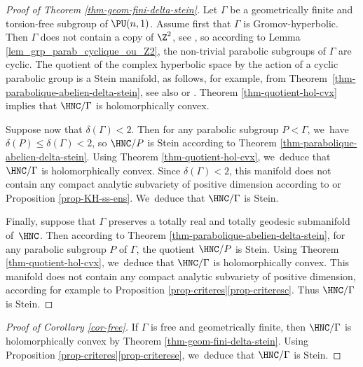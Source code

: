 \begin{proof}[Proof of Theorem \ref{thm-geom-fini-delta-stein}]
Let $\Gamma$ be a geometrically finite and torsion-free subgroup of $\PU(n,1)$. Assume first that $\Gamma$ is Gromov-hyperbolic. Then $\Gamma$ does not contain a copy of $\Z^{2}$, see \cite[Cor.\,III.$\Gamma$.3.10]{bridsonMetricSpacesNonpositive1999}, so according to Lemma \ref{lem_grp_parab_cyclique_ou_Z2}, the non-trivial parabolic subgroups of $\Gamma$ are cyclic. The quotient of the complex hyperbolic space by the action of a cyclic parabolic group is a Stein manifold, as follows, for example, from Theorem~\ref{thm-parabolique-abelien-delta-stein}, see also \cite{defabritiisQuotientsUnitBall2001manuel} or \cite{miebachQuotientsBoundedHomogeneous2010}. Theorem \ref{thm-quotient-hol-cvx} implies that $\HNC/\Gamma$ is holomorphically convex.

Suppose now that $\delta(\Gamma)<2$. Then for any parabolic subgroup $P<\Gamma$, we~have $\delta(P)\le \delta(\Gamma)<2$, so $\HNC/P$ is Stein according to Theorem \ref{thm-parabolique-abelien-delta-stein}. Using Theorem \ref{thm-quotient-hol-cvx}, we~deduce that $\HNC/\Gamma$ is holomorphically convex. Since $\delta(\Gamma)<2$, this manifold does not contain any compact analytic subvariety of positive dimension according to \cite[Th.\,15]{deyNoteComplexhyperbolicKleinian2020} or Proposition \ref{prop-KH-ss-ens}. We~deduce that $\HNC/\Gamma$ is Stein.

Finally, suppose that $\Gamma$ preserves a totally real and totally geodesic submanifold of~$\HNC$. Then according to Theorem \ref{thm-parabolique-abelien-delta-stein}, for any parabolic subgroup $P$ of $\Gamma$, the quotient $\HNC/P$ is Stein. Using Theorem \ref{thm-quotient-hol-cvx}, we~deduce that $\HNC/\Gamma$ is holomorphically convex. This manifold does not contain any compact analytic subvariety of positive dimension, according for example to Proposition \ref{prop-criteres}\eqref{prop-criteresc}. Thus $\HNC/\Gamma$ is Stein.
\end{proof}

\begin{proof}[Proof of Corollary \ref{cor-free}]
If $\Gamma$ is free and geometrically finite, then $\HNC/\Gamma$ is holomorphically convex by Theorem \ref{thm-geom-fini-delta-stein}. Using Proposition \ref{prop-criteres}\eqref{prop-criterese}, we~deduce that $\HNC/\Gamma$ is Stein.
\end{proof}

